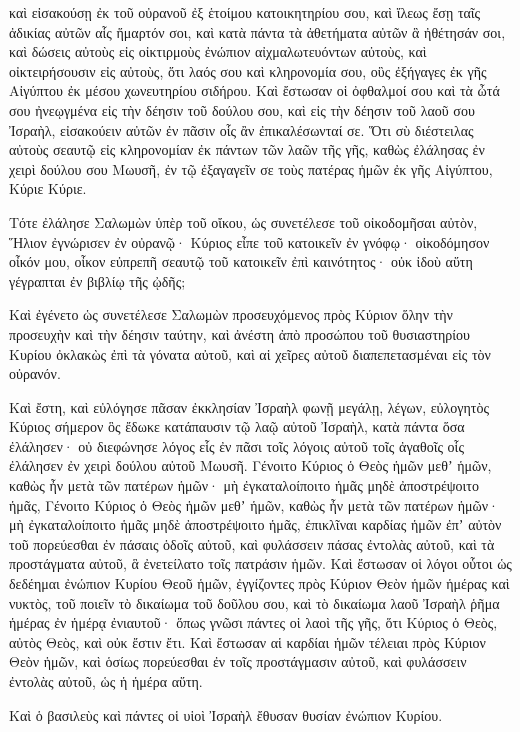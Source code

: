 {καὶ εἰσακούσῃ ἐκ τοῦ οὐρανοῦ ἐξ ἑτοίμου κατοικητηρίου σου,
καὶ ἵλεως ἔσῃ ταῖς ἀδικίας αὐτῶν αἷς ἥμαρτόν σοι, καὶ κατὰ πάντα τὰ ἀθετήματα αὐτῶν ἃ ἠθέτησάν σοι, καὶ δώσεις αὐτοὺς εἰς οἰκτιρμοὺς ἐνώπιον αἰχμαλωτευόντων αὐτοὺς, καὶ οἰκτειρήσουσιν εἰς αὐτοὺς,
ὅτι λαός σου καὶ κληρονομία σου, οὓς ἐξήγαγες ἐκ γῆς Αἰγύπτου ἐκ μέσου χωνευτηρίου σιδήρου.
Καὶ ἔστωσαν οἱ ὀφθαλμοί σου καὶ τὰ ὦτά σου ἠνεῳγμένα εἰς τὴν δέησιν τοῦ δούλου σου, καὶ εἰς τὴν δέησιν τοῦ λαοῦ σου Ἰσραὴλ, εἰσακούειν αὐτῶν ἐν πᾶσιν οἷς ἂν ἐπικαλέσωνταί σε.
Ὅτι σὺ διέστειλας αὐτοὺς σεαυτῷ εἰς κληρονομίαν ἐκ πάντων τῶν λαῶν τῆς γῆς, καθὼς ἐλάλησας ἐν χειρὶ δούλου σου Μωυσῆ, ἐν τῷ ἐξαγαγεῖν σε τοὺς πατέρας ἡμῶν ἐκ γῆς Αἰγύπτου, Κύριε Κύριε.
\par }{\PP {}Τότε ἐλάλησε Σαλωμὼν ὑπὲρ τοῦ οἴκου, ὡς συνετέλεσε τοῦ οἰκοδομῆσαι αὐτὸν, Ἥλιον ἐγνώρισεν ἐν οὐρανῷ· Κύριος εἶπε τοῦ κατοικεῖν ἐν γνόφῳ· οἰκοδόμησον οἶκόν μου, οἶκον εὐπρεπῆ σεαυτῷ τοῦ κατοικεῖν ἐπὶ καινότητος· οὐκ ἰδοὺ αὕτη γέγραπται ἐν βιβλίῳ τῆς ᾠδῆς;
\par }{\PP {}Καὶ ἐγένετο ὡς συνετέλεσε Σαλωμὼν προσευχόμενος πρὸς Κύριον ὅλην τὴν προσευχὴν καὶ τὴν δέησιν ταύτην, καὶ ἀνέστη ἀπὸ προσώπου τοῦ θυσιαστηρίου Κυρίου ὀκλακὼς ἐπὶ τὰ γόνατα αὐτοῦ, καὶ αἱ χεῖρες αὐτοῦ διαπεπετασμέναι εἰς τὸν οὐρανόν.
\par }{\PP {}Καὶ ἔστη, καὶ εὐλόγησε πᾶσαν ἐκκλησίαν Ἰσραὴλ φωνῇ μεγάλῃ, λέγων,
εὐλογητὸς Κύριος σήμερον ὃς ἔδωκε κατάπαυσιν τῷ λαῷ αὐτοῦ Ἰσραὴλ, κατὰ πάντα ὅσα ἐλάλησεν· οὐ διεφώνησε λόγος εἷς ἐν πᾶσι τοῖς λόγοις αὐτοῦ τοῖς ἀγαθοῖς οἷς ἐλάλησεν ἐν χειρὶ δούλου αὐτοῦ Μωυσῆ.
Γένοιτο Κύριος ὁ Θεὸς ἡμῶν μεθʼ ἡμῶν, καθὼς ἦν μετὰ τῶν πατέρων ἡμῶν· μὴ ἐγκαταλοίποιτο ἡμᾶς μηδὲ ἀποστρέψοιτο ἡμᾶς,
Γένοιτο Κύριος ὁ Θεὸς ἡμῶν μεθʼ ἡμῶν, καθὼς ἦν μετὰ τῶν πατέρων ἡμῶν· μὴ ἐγκαταλοίποιτο ἡμᾶς μηδὲ ἀποστρέψοιτο ἡμᾶς, ἐπικλῖναι καρδίας ἡμῶν ἐπʼ αὐτὸν τοῦ πορεύεσθαι ἐν πάσαις ὁδοῖς αὐτοῦ, καὶ φυλάσσειν πάσας ἐντολὰς αὐτοῦ, καὶ τὰ προστάγματα αὐτοῦ, ἃ ἐνετείλατο τοῖς πατράσιν ἡμῶν.
Καὶ ἔστωσαν οἱ λόγοι οὗτοι ὡς δεδέημαι ἐνώπιον Κυρίου Θεοῦ ἡμῶν, ἐγγίζοντες πρὸς Κύριον Θεὸν ἡμῶν ἡμέρας καὶ νυκτὸς, τοῦ ποιεῖν τὸ δικαίωμα τοῦ δοῦλου σου, καὶ τὸ δικαίωμα λαοῦ Ἰσραὴλ ῥῆμα ἡμέρας ἐν ἡμέρᾳ ἐνιαυτοῦ·
ὅπως γνῶσι πάντες οἱ λαοὶ τῆς γῆς, ὅτι Κύριος ὁ Θεὸς, αὐτὸς Θεὸς, καὶ οὐκ ἔστιν ἔτι.
Καὶ ἔστωσαν αἱ καρδίαι ἡμῶν τέλειαι πρὸς Κύριον Θεὸν ἡμῶν, καὶ ὁσίως πορεύεσθαι ἐν τοῖς προστάγμασιν αὐτοῦ, καὶ φυλάσσειν ἐντολὰς αὐτοῦ, ὡς ἡ ἡμέρα αὕτη.
\par }{\PP {}Καὶ ὁ βασιλεὺς καὶ πάντες οἱ υἱοὶ Ἰσραὴλ ἔθυσαν θυσίαν ἐνώπιον Κυρίου.
}
